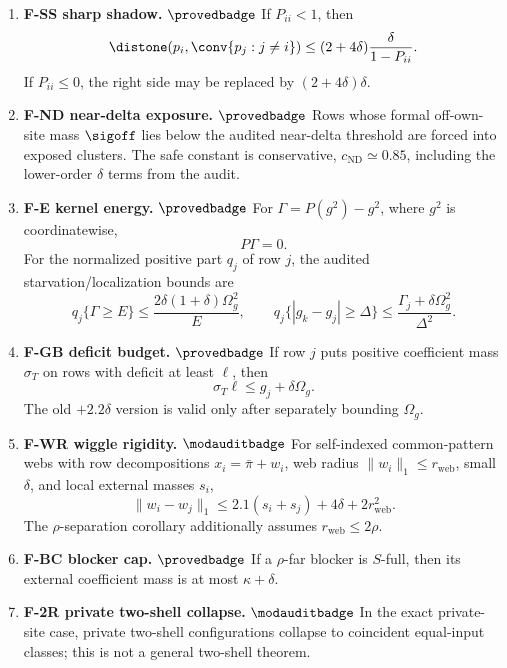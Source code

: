 \begin{enumerate}[leftmargin=*,itemsep=0.5ex]
\item \textbf{F-SS sharp shadow.} \(\provedbadge\)
If \(P_{ii}<1\), then
\[
 \distone(p_i,\conv\{p_j:j\ne i\})
       \le (2+4\delta)\frac{\delta}{1-P_{ii}} .
\]
If \(P_{ii}\le 0\), the right side may be replaced by \((2+4\delta)\delta\).

\item \textbf{F-ND near-delta exposure.} \(\provedbadge\)
Rows whose formal off-own-site mass \(\sigoff\) lies below the audited
near-delta threshold are forced into exposed clusters.  The safe constant
is conservative, \(c_{\mathrm{ND}}\simeq0.85\), including the lower-order
\(\delta\) terms from the audit.

\item \textbf{F-E kernel energy.} \(\provedbadge\)
For \(\Gamma=P(g^2)-g^2\), where \(g^2\) is coordinatewise,
\[
        P\Gamma=0 .
\]
For the normalized positive part \(q_j\) of row \(j\), the audited
starvation/localization bounds are
\[
q_j\{\Gamma\ge E\}\le \frac{2\delta(1+\delta)\Omega_g^2}{E},
\qquad
q_j\{|g_k-g_j|\ge\Delta\}\le\frac{\Gamma_j+\delta\Omega_g^2}{\Delta^2}.
\]

\item \textbf{F-GB deficit budget.} \(\provedbadge\)
If row \(j\) puts positive coefficient mass \(\sigma_T\) on rows with
deficit at least \(\ell\), then
\[
        \sigma_T\ell\le g_j+\delta\Omega_g .
\]
The old \(+2.2\delta\) version is valid only after separately bounding
\(\Omega_g\).

\item \textbf{F-WR wiggle rigidity.} \(\modauditbadge\)
For self-indexed common-pattern webs with row decompositions
\(x_i=\bar\pi+w_i\), web radius \(\|w_i\|_1\le r_{\mathrm{web}}\), small
\(\delta\), and local external masses \(s_i\),
\[
 \|w_i-w_j\|_1\le 2.1(s_i+s_j)+4\delta+2r_{\mathrm{web}}^2 .
\]
The \(\rho\)-separation corollary additionally assumes
\(r_{\mathrm{web}}\le 2\rho\).

\item \textbf{F-BC blocker cap.} \(\provedbadge\)
If a \(\rho\)-far blocker is \(S\)-full, then its external coefficient
mass is at most \(\kappa+\delta\).

\item \textbf{F-2R private two-shell collapse.} \(\modauditbadge\)
In the exact private-site case, private two-shell configurations collapse
to coincident equal-input classes; this is not a general two-shell theorem.
\end{enumerate}

